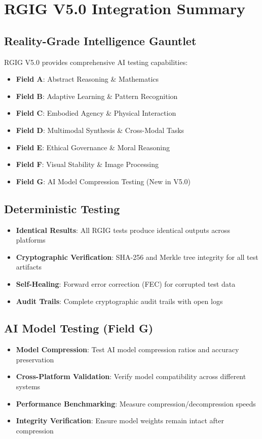 \documentclass[12pt,a4paper]{article}
\begin{document}
\section{RGIG V5.0 Integration Summary}

\subsection{Reality-Grade Intelligence Gauntlet}
RGIG V5.0 provides comprehensive AI testing capabilities:

\begin{itemize}
    \item \textbf{Field A}: Abstract Reasoning \& Mathematics
    \item \textbf{Field B}: Adaptive Learning \& Pattern Recognition
    \item \textbf{Field C}: Embodied Agency \& Physical Interaction
    \item \textbf{Field D}: Multimodal Synthesis \& Cross-Modal Tasks
    \item \textbf{Field E}: Ethical Governance \& Moral Reasoning
    \item \textbf{Field F}: Visual Stability \& Image Processing
    \item \textbf{Field G}: AI Model Compression Testing (New in V5.0)
\end{itemize}

\subsection{Deterministic Testing}
\begin{itemize}
    \item \textbf{Identical Results}: All RGIG tests produce identical outputs across platforms
    \item \textbf{Cryptographic Verification}: SHA-256 and Merkle tree integrity for all test artifacts
    \item \textbf{Self-Healing}: Forward error correction (FEC) for corrupted test data
    \item \textbf{Audit Trails}: Complete cryptographic audit trails with open logs
\end{itemize}

\subsection{AI Model Testing (Field G)}
\begin{itemize}
    \item \textbf{Model Compression}: Test AI model compression ratios and accuracy preservation
    \item \textbf{Cross-Platform Validation}: Verify model compatibility across different systems
    \item \textbf{Performance Benchmarking}: Measure compression/decompression speeds
    \item \textbf{Integrity Verification}: Ensure model weights remain intact after compression
\end{itemize}
\end{document}
